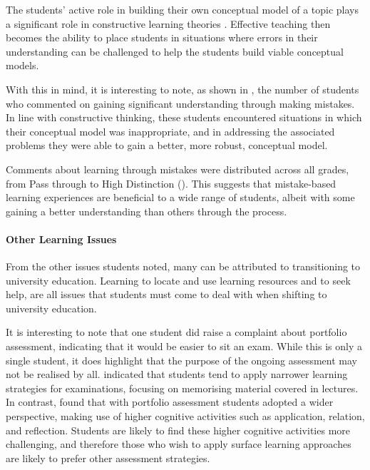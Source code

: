 The students' active role in building their own conceptual model of a topic plays a significant role in constructive learning theories \cite{Glasersfeld:1989}. Effective teaching then becomes the ability to place students in situations where errors in their understanding can be challenged to help the students build viable conceptual models. 

With this in mind, it is interesting to note, as shown in , the number of students who commented on gaining significant understanding through making mistakes. In line with constructive thinking, these students encountered situations in which their conceptual model was inappropriate, and in addressing the associated problems they were able to gain a better, more robust, conceptual model.

Comments about learning through mistakes were distributed across all grades, from Pass through to High Distinction (). This suggests that mistake-based learning experiences are beneficial to a wide range of students, albeit with some gaining a better understanding than others through the process. 



\paragraph{Other Learning Issues} %
\label{ssub:other_learning_issues}

From the other issues students noted, many can be attributed to transitioning to university education. Learning to locate and use learning resources and to seek help, are all issues that students must come to deal with when shifting to university education.

It is interesting to note that one student did raise a complaint about portfolio assessment, indicating that it would be easier to sit an exam. While this is only a single student, it does highlight that the purpose of the ongoing assessment may not be realised by all. \citet{Tang:1999} indicated that students tend to apply narrower learning strategies for examinations, focusing on memorising material covered in lectures. In contrast, \citet{Tang:1999} found that with portfolio assessment students adopted a wider perspective, making use of higher cognitive activities such as application, relation, and reflection. Students are likely to find these higher cognitive activities more challenging, and therefore those who wish to apply surface learning approaches are likely to prefer other assessment strategies.

